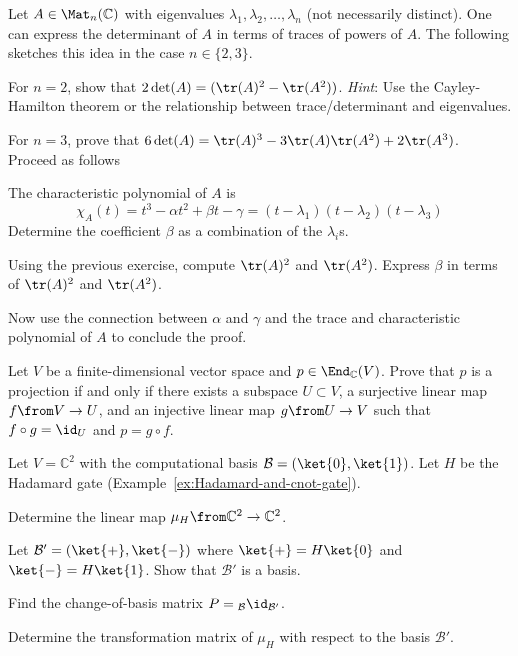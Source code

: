 \documentclass[a4paper,oneside, 12pt]{amsart}
\begin{document}
\begin{exercise}
  Let \(A \in \Mat_n(\mathbb{C})\) with eigenvalues \(\lambda_{1}, \lambda_{2}, \dots , \lambda_{n}\) (not necessarily distinct).
  One can express the determinant of \(A\) in terms of traces of powers of \(A\).
  The following sketches this idea in the case \(n\in\{2,3\}\).
  \begin{thmlist}
    \item For \(n=2\), show that \(2\det(A) = (\tr(A)^2 - \tr(A^2))\).
    \textit{Hint}: Use the Cayley-Hamilton theorem or the relationship between trace/determinant and eigenvalues.
  \end{thmlist}
  For \(n=3\), prove that \(6 \det(A) = \tr(A)^{3} - 3 \tr(A)\tr(A^{2}) + 2 \tr(A^{3})\).
  Proceed as follows
  \begin{thmlist}
    \item  The characteristic polynomial of \(A\) is
    \begin{equation*}
      \chi_{A}(t) = t^{3} - \alpha t^{2} + \beta t - \gamma = (t- \lambda_{1})(t- \lambda_{2})(t-\lambda_{3})
    \end{equation*}
    Determine the coefficient \(\beta\) as a combination of the \(\lambda_{i}\)s.
    \item Using the previous exercise, compute  \(\tr(A)^{2}\) and \(\tr(A^{2})\).
    Express \(\beta\)  in terms of \(\tr(A)^{2}\) and \(\tr(A^{2})\).
    \item Now use the connection between \(\alpha\) and \(\gamma\) and the trace and characteristic polynomial of \(A\) to conclude the proof.
  \end{thmlist}
\end{exercise}


\begin{exercise}
  Let \(V\) be a finite-dimensional vector space and \(p \in \End_{\mathbb{C}}(V)\).
  Prove that \(p\) is a projection if and only if there exists a subspace \(U \subset V\), a surjective linear map \(f \from V \to U\), and an injective linear map \(g \from U \to V\) such that \(f \circ g = \id_U\) and \(p = g \circ f\).
\end{exercise}

\begin{exercise}
  Let \(V = \mathbb{C}^2\) with the computational basis \(\mathcal{B} = (\ket{0}, \ket{1})\).
  Let \(H\) be the Hadamard gate (Example~\ref{ex:Hadamard-and-cnot-gate}).
  \begin{thmlist}
    \item Determine the linear map \(\mu_{H}\from \mathbb{C}^{2}\to \mathbb{C}^{2}\).
    \item Let \(\mathcal{B}' = (\ket{+}, \ket{-})\) where \(\ket{+} = H\ket{0}\) and \(\ket{-} = H\ket{1}\).
    Show that \(\mathcal{B}'\) is a basis.
    \item Find the change-of-basis matrix \(P = {}_{\mathcal{B}}\id_{\mathcal{B}'}\).
    \item Determine the transformation matrix of \(\mu_{H}\) with respect to the basis \(\mathcal{B}'\).
  \end{thmlist}
\end{exercise}
\end{document}

